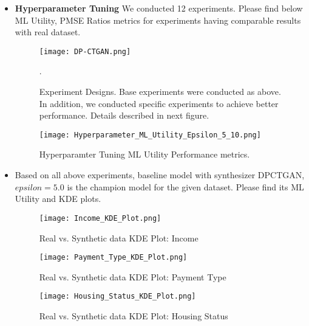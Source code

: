 \documentclass[10pt,twocolumn,letterpaper]{article}
\begin{document}
\begin{itemize}

    \item \textbf{Hyperparameter Tuning} We conducted 12 experiments. Please find below ML Utility, PMSE Ratios metrics for experiments having comparable results with real dataset.
    \begin{figure}[ht]
    \begin{center}
       \texttt{[image: DP-CTGAN.png]}
    \end{center}
       \caption{Experiment Designs. Base experiments were conducted as above. In addition, we conducted specific experiments to achieve better performance. Details described in next figure.}.
    \label{fig:long}
    \label{fig:onecol}
    \end{figure}

    \begin{figure}[ht]
    \begin{center}
       \texttt{[image: Hyperparameter\_ML\_Utility\_Epsilon\_5\_10.png]}
    \end{center}
       \caption{Hyperparamter Tuning ML Utility Performance metrics.}
    \label{fig:long}
    \label{fig:onecol}
    \end{figure}

    \item Based on all above experiments, baseline model with synthesizer DPCTGAN, $epsilon=5.0$ is the champion model for the given dataset. Please find its ML Utility and KDE plots.
    \begin{figure}[ht]
        \begin{center}
           \texttt{[image: Income\_KDE\_Plot.png]}
        \end{center}
           \caption{Real vs. Synthetic data KDE Plot: Income}
        \label{fig:long}
        \label{fig:onecol}
    \end{figure}
    \begin{figure}[ht]
        \begin{center}
           \texttt{[image: Payment\_Type\_KDE\_Plot.png]}
        \end{center}
           \caption{Real vs. Synthetic data KDE Plot: Payment Type}
        \label{fig:long}
        \label{fig:onecol}
    \end{figure}
    \begin{figure}[ht]
        \begin{center}
           \texttt{[image: Housing\_Status\_KDE\_Plot.png]}
        \end{center}
           \caption{Real vs. Synthetic data KDE Plot: Housing Status}
        \label{fig:long}
        \label{fig:onecol}
    \end{figure}


\end{itemize}
\end{document}
